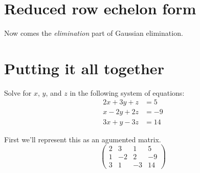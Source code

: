 \documentclass{ximera}
\begin{document}
\section{Reduced row echelon form}


Now comes the \emph{elimination} part of Gaussian elimination. 

\section{Putting it all together}


\begin{example}
  Solve for $x$, $y$, and $z$ in the following system of equations:
  \begin{align*}
    2x + 3y + z  &= 5 \\
    x -2y+ 2z &=-9\\
    3x +y- 3z &=14
  \end{align*}

\begin{solution}
First we'll represent this as an agumented matrix.
\[
\left(\begin{array}{ccc|c}
  2 & 3 & 1 & 5 \\
  1 &  -2 & 2 &-9 \\
  3 &  1 & -3 & 14
\end{array}\right)

\]
\end{solution}
\end{example}
\end{document}
